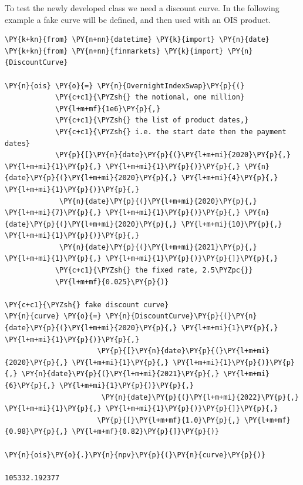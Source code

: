     To test the newly developed class we need a discount curve. In the
following example a fake curve will be defined, and then used with an
OIS product.

    \begin{tcolorbox}[breakable, size=fbox, boxrule=1pt, pad at break*=1mm,colback=cellbackground, colframe=cellborder]
\begin{Verbatim}[commandchars=\\\{\}]
\PY{k+kn}{from} \PY{n+nn}{datetime} \PY{k}{import} \PY{n}{date}
\PY{k+kn}{from} \PY{n+nn}{finmarkets} \PY{k}{import} \PY{n}{DiscountCurve}

\PY{n}{ois} \PY{o}{=} \PY{n}{OvernightIndexSwap}\PY{p}{(}
            \PY{c+c1}{\PYZsh{} the notional, one million}
            \PY{l+m+mf}{1e6}\PY{p}{,}
            \PY{c+c1}{\PYZsh{} the list of product dates,}
            \PY{c+c1}{\PYZsh{} i.e. the start date then the payment dates}
            \PY{p}{[}\PY{n}{date}\PY{p}{(}\PY{l+m+mi}{2020}\PY{p}{,} \PY{l+m+mi}{1}\PY{p}{,} \PY{l+m+mi}{1}\PY{p}{)}\PY{p}{,} \PY{n}{date}\PY{p}{(}\PY{l+m+mi}{2020}\PY{p}{,} \PY{l+m+mi}{4}\PY{p}{,} \PY{l+m+mi}{1}\PY{p}{)}\PY{p}{,}
             \PY{n}{date}\PY{p}{(}\PY{l+m+mi}{2020}\PY{p}{,} \PY{l+m+mi}{7}\PY{p}{,} \PY{l+m+mi}{1}\PY{p}{)}\PY{p}{,} \PY{n}{date}\PY{p}{(}\PY{l+m+mi}{2020}\PY{p}{,} \PY{l+m+mi}{10}\PY{p}{,} \PY{l+m+mi}{1}\PY{p}{)}\PY{p}{,}
             \PY{n}{date}\PY{p}{(}\PY{l+m+mi}{2021}\PY{p}{,} \PY{l+m+mi}{1}\PY{p}{,} \PY{l+m+mi}{1}\PY{p}{)}\PY{p}{]}\PY{p}{,}
            \PY{c+c1}{\PYZsh{} the fixed rate, 2.5\PYZpc{}}
            \PY{l+m+mf}{0.025}\PY{p}{)}

\PY{c+c1}{\PYZsh{} fake discount curve}
\PY{n}{curve} \PY{o}{=} \PY{n}{DiscountCurve}\PY{p}{(}\PY{n}{date}\PY{p}{(}\PY{l+m+mi}{2020}\PY{p}{,} \PY{l+m+mi}{1}\PY{p}{,} \PY{l+m+mi}{1}\PY{p}{)}\PY{p}{,}
                      \PY{p}{[}\PY{n}{date}\PY{p}{(}\PY{l+m+mi}{2020}\PY{p}{,} \PY{l+m+mi}{1}\PY{p}{,} \PY{l+m+mi}{1}\PY{p}{)}\PY{p}{,} \PY{n}{date}\PY{p}{(}\PY{l+m+mi}{2021}\PY{p}{,} \PY{l+m+mi}{6}\PY{p}{,} \PY{l+m+mi}{1}\PY{p}{)}\PY{p}{,}
                       \PY{n}{date}\PY{p}{(}\PY{l+m+mi}{2022}\PY{p}{,} \PY{l+m+mi}{1}\PY{p}{,} \PY{l+m+mi}{1}\PY{p}{)}\PY{p}{]}\PY{p}{,}
                      \PY{p}{[}\PY{l+m+mf}{1.0}\PY{p}{,} \PY{l+m+mf}{0.98}\PY{p}{,} \PY{l+m+mf}{0.82}\PY{p}{]}\PY{p}{)}

\PY{n}{ois}\PY{o}{.}\PY{n}{npv}\PY{p}{(}\PY{n}{curve}\PY{p}{)}

105332.192377
\end{Verbatim}
\end{tcolorbox}

